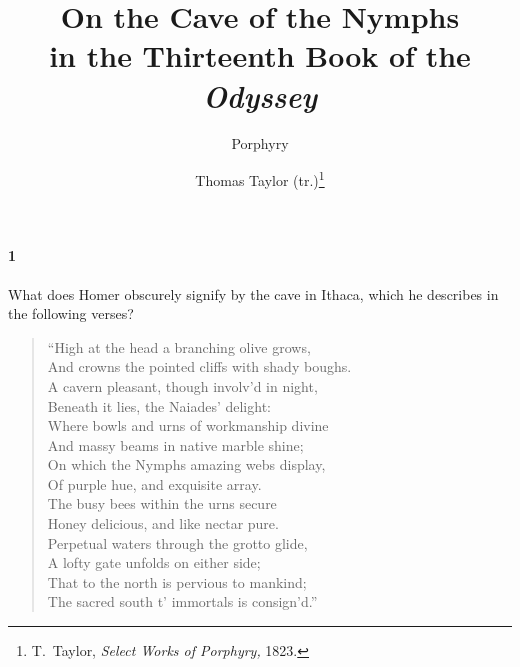 \documentclass[a4paper,12pt]{article}
\title{On the Cave of the Nymphs\\in the Thirteenth Book of the \textit{Odyssey}}
\author{Porphyry \and Thomas Taylor (tr.)\footnote{T.~Taylor, \textit{Select Works of Porphyry,} 1823.}}
\date{}
\begin{document}
\maketitle


\paragraph{1} What does Homer obscurely signify by the cave in Ithaca, which he
describes in the following verses?

\begin{verse}
``High at the head a branching olive grows,\\
And crowns the pointed cliffs with shady boughs.\\
A cavern pleasant, though involv'd in night,\\
Beneath it lies, the Naiades' delight:\\
Where bowls and urns of workmanship divine\\
And massy beams in native marble shine;\\
On which the Nymphs amazing webs display,\\
Of purple hue, and exquisite array.\\
The busy bees within the urns secure\\
Honey delicious, and like nectar pure.\\
Perpetual waters through the grotto glide,\\
A lofty gate unfolds on either side;\\
That to the north is pervious to mankind;\\
The sacred south t' immortals is consign'd.''
\end{verse}
\end{document}
